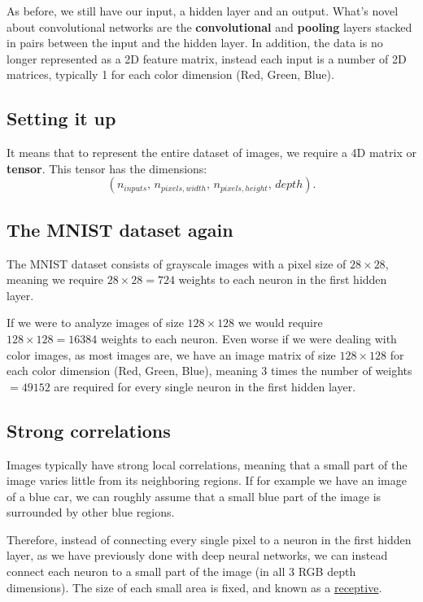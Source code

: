 \documentclass[%
oneside,                 %
final,                   %
10pt]{article}
\begin{document}
As before, we still have our input, a hidden layer and an output. What's novel about convolutional networks
are the \textbf{convolutional} and \textbf{pooling} layers stacked in pairs between the input and the hidden layer.
In addition, the data is no longer represented as a 2D feature matrix, instead each input is a number of 2D
matrices, typically 1 for each color dimension (Red, Green, Blue). 


\subsection{Setting it up}

It means that to represent the entire
dataset of images, we require a 4D matrix or \textbf{tensor}. This tensor has the dimensions:  
\[  
(n_{inputs},\, n_{pixels, width},\, n_{pixels, height},\, depth) .
\]

\subsection{The MNIST dataset again}

The MNIST dataset consists of grayscale images with a pixel size of
$28\times 28$, meaning we require $28 \times 28 = 724$ weights to each
neuron in the first hidden layer.

If we were to analyze images of size $128\times 128$ we would require
$128 \times 128 = 16384$ weights to each neuron. Even worse if we were
dealing with color images, as most images are, we have an image matrix
of size $128\times 128$ for each color dimension (Red, Green, Blue),
meaning 3 times the number of weights $= 49152$ are required for every
single neuron in the first hidden layer.


\subsection{Strong correlations}
Images typically have strong local correlations, meaning that a small
part of the image varies little from its neighboring regions. If for
example we have an image of a blue car, we can roughly assume that a
small blue part of the image is surrounded by other blue regions.

Therefore, instead of connecting every single pixel to a neuron in the
first hidden layer, as we have previously done with deep neural
networks, we can instead connect each neuron to a small part of the
image (in all 3 RGB depth dimensions).  The size of each small area is
fixed, and known as a \href{{https://en.wikipedia.org/wiki/Receptive_field}}{receptive}.
\end{document}
